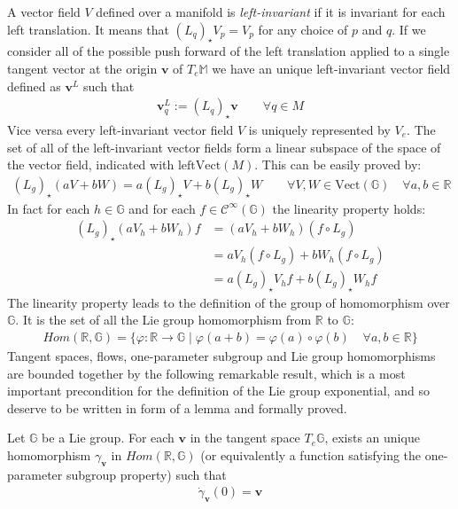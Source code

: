 A vector field $V$ defined over a manifold is \emph{left-invariant} if it is invariant for each left translation. It means that $(L_{q})_{\star} V_{p} = V_{p}$ for any choice of $p$ and $q$. If we consider all of the possible push forward of the left translation applied to a single tangent vector at the origin $\mathbf{v}$ of $T_{e}\mathbb{M}$ we have an unique left-invariant vector field defined as $\mathbf{v}^{L}$ such that
\begin{align*}
\mathbf{v}^{L}_{q} := (L_{q})_{\star} \mathbf{v} \qquad \forall q \in M
\end{align*}
Vice versa every left-invariant vector field $V$ is uniquely represented by $V_{e}$.
The set of all of the left-invariant vector fields form a linear subspace of the space of the vector field, indicated with $\text{left}\text{Vect}(M)$. This can be easily proved by:
\begin{align*}
(L_{g})_{\star} (aV +bW) = a (L_{g})_{\star} V + b (L_{g})_{\star} W
\qquad 
\forall V, W \in \text{Vect}(\mathbb{G}) 
\quad 
\forall a, b \in \mathbb{R}
\end{align*}
In fact for each $h \in \mathbb{G}$ and for each $f \in \mathcal{C}^{\infty}(\mathbb{G})$ the linearity property holds:
\begin{align*}
(L_{g})_{\star} (aV_{h} +bW_{h})f &= (aV_{h} +bW_{h})(f\circ L_{g} ) \\
&= aV_{h}(f\circ L_{g} ) +bW_{h}(f\circ L_{g} ) \\
&= a (L_{g})_{\star} V_{h}f + b (L_{g})_{\star} W_{h}f  
\end{align*}
The linearity property leads to the definition of the group of homomorphism over $\mathbb{G}$. It is the set of all the Lie group homomorphism from $\mathbb{R}$ to $\mathbb{G}$:
\begin{align*}
Hom(\mathbb{R},\mathbb{G}) = \lbrace \varphi: \mathbb{R} \rightarrow \mathbb{G} \mid \varphi(a+b) = \varphi(a) \circ \varphi(b)\phantom{aa} \forall a,b \in \mathbb{R} \rbrace
\end{align*}
Tangent spaces, flows, one-parameter subgroup and Lie group homomorphisms are bounded together by the following remarkable result, which is a most important precondition for the definition of the Lie group exponential, and so deserve to be written in form of a lemma and formally proved. 
\begin{lemma}
	Let $\mathbb{G}$ be a Lie group. For each $\mathbf{v}$ in the tangent space $T_{e}\mathbb{G}$, exists an unique homomorphism $\gamma_{\mathbf{v}}$ in $Hom(\mathbb{R},\mathbb{G})$ (or equivalently a function satisfying the one-parameter subgroup property) such that 
	\begin{align*}
	\dot{\gamma}_{\mathbf{v}}(0) = \mathbf{v}
	\end{align*}
\end{lemma}
